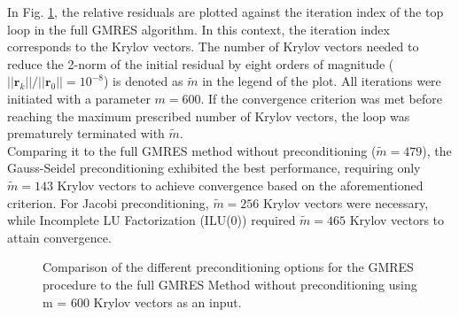 \documentclass[11pt,a4paper]{article}
\newcommand{\refFig}[1]{Fig. \ref{#1}}
\begin{document}
In \refFig{fig::Residuals}, the relative residuals are plotted against the iteration index of the top loop in the full GMRES algorithm. In this context, the iteration index corresponds to the Krylov vectors. The number of Krylov vectors needed to reduce the 2-norm of the initial residual by eight orders of magnitude ($||\mathbf{r}_k|| / ||\mathbf{r}_0|| = 10^{-8}$) is denoted as $\tilde{m}$ in the legend of the plot. All iterations were initiated with a parameter $m = 600$. If the convergence criterion was met before reaching the maximum prescribed number of Krylov vectors, the loop was prematurely terminated with $\tilde{m}$.\\ 
%
Comparing it to the full GMRES method without preconditioning ($\tilde{m} = 479$), the Gauss-Seidel preconditioning exhibited the best performance, requiring only $\tilde{m} = 143$ Krylov vectors to achieve convergence based on the aforementioned criterion. For Jacobi preconditioning, $\tilde{m} = 256$ Krylov vectors were necessary, while Incomplete LU Factorization (ILU(0)) required $\tilde{m} = 465$ Krylov vectors to attain convergence.
%
\begin{figure}[!htbp]
	\centering
	\hspace*{0.8cm}
	\leavevmode
	\resizebox{0.82\width}{!}{}
	\caption{Comparison of the different preconditioning options for the GMRES procedure to the full GMRES Method without preconditioning using m = 600 Krylov vectors as an input.}
	\label{fig::Residuals}
\end{figure}
%
\end{document}
